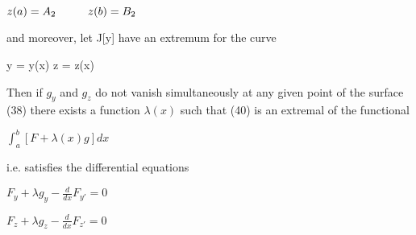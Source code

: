\documentclass{article}
\newcommand\tab[1][1cm]{\hspace*{#1}}
\begin{document}
\begin{center}
$z(a) = A_2 \tab z(b) = B_2$
\end{center}
and moreover, let J[y] have an extremum for the curve
\begin{center}
y = y(x) \tab z = z(x)
\end{center}
Then if $g_y$ and $g_z$ do not vanish simultaneously at any given point of the surface (38) there exists a function $\lambda (x)$ such that (40) is an extremal of the functional
\begin{center}
$\int_a^b [F + \lambda (x) g] dx$
\end{center}
i.e. satisfies the differential equations
\begin{center}
$F_y + \lambda g_y - \frac{d}{dx} F_{y'} = 0$
\end{center}

\begin{center}
$F_z + \lambda g_z - \frac{d}{dx} F_{z'} = 0$
\end{center}
\end{document}
